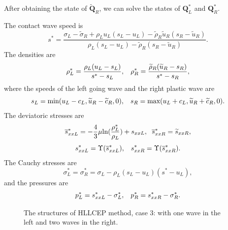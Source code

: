 \documentclass{article}
\numberwithin{equation}{section}
\numberwithin{table}{section}
\begin{document}
After obtaining the state of $\widetilde{\bm{Q}}_R$, we can solve the states of $\bm{Q}_L^*$ and  $\bm{Q}_R^*$.

The contact wave speed is
\begin{equation}
  s^* = \frac{\sigma_L-\widetilde{\sigma}_R+\rho_L u_L(s_L-u_L)-\widetilde{\rho}_R \widetilde{u}_R(s_R-\widetilde{u}_R)}{\rho_L(s_L-u_L)-\widetilde{\rho}_R(s_R-\widetilde{u}_R)}.
\end{equation}
The densities are
\begin{equation}\label{eq:rhoLs}
  \rho_L^* = \frac{\rho_L(u_L-s_L)}{s^*-s_L}, \hspace{0.3cm}  \rho_R^* = \frac{\widetilde{\rho}_R(\widetilde{u}_R-s_R)}{s^*-s_R},
\end{equation}
where the  speeds of the left going wave and the right plastic wave are
	\begin{equation}
	  s_L = \text{min} (u_L-c_L, \widetilde{u}_R-\widetilde{c}_R,0), \hspace{0.3cm} s_R = \text{max}(u_L+c_L, \widetilde{u}_R+\widetilde{c}_R,0).
	\end{equation}
	The deviatoric stresses are
\begin{equation}
  \overline{s}_{xxL}^*=-\frac{4}{3}\mu\text{ln}(\frac{\rho_L^*}{\rho_L})+s_{xxL},\hspace{0.2cm}  \overline{s}_{xxR}^*=\widetilde{s}_{xxR},
\end{equation}
\begin{equation}
  s_{xxL}^* = \Upsilon(\overline{s}_{xxL}^*), \hspace{0.3cm}  s_{xxR}^* = \Upsilon(\overline{s}_{xxR}^*).
\end{equation}
The Cauchy stresses are
\begin{equation}
  \sigma_L^*=\sigma_R^*=\sigma_L -\rho_L (s_L-u_L)(s^*-u_L),
\end{equation}
and the pressures are
\begin{equation}
  p_L^* = s_{xxL}^* - \sigma_L^*, \hspace{0.3cm}   p_R^* = s_{xxR}^* - \sigma_R^*.
\end{equation}

\begin{figure}
  \centering
\caption{The  structures of HLLCEP method, case 3: with one wave in the left and two waves in  the right.}
\label{fig:case3}
\end{figure}
\end{document}
